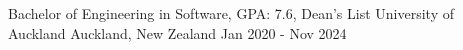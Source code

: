 
\begin{cventries}
  \cventry
    {Bachelor of Engineering in Software, GPA: 7.6, Dean's List} %
    {University of Auckland} %
    {Auckland, New Zealand} %
    {Jan 2020 - Nov 2024} %
    \item{}
    \vspace{-15mm}

\end{cventries}

